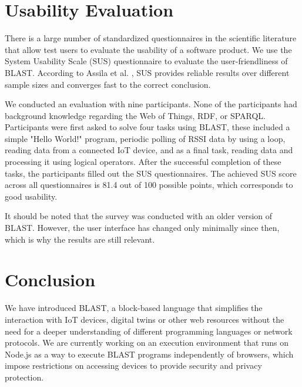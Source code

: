 \documentclass[runningheads]{llncs}
\begin{document}
\section{Usability Evaluation }
There is a large number of standardized questionnaires in the scientific literature that allow test users to evaluate the usability of a software product. We use the System Usability Scale (SUS) questionnaire to evaluate the user-friendliness of BLAST. According to Assila et al. \cite{assila2016standardized}, SUS provides reliable results over different sample sizes and converges fast to the correct conclusion. 

We conducted an evaluation with nine participants. None of the participants had background knowledge regarding the Web of Things, RDF, or SPARQL. Participants were first asked to solve four tasks using BLAST, these included a simple "Hello World!" program, periodic polling of RSSI data by using a loop, reading data from a connected IoT device, and as a final task, reading data and processing it using logical operators. After the successful completion of these tasks, the participants filled out the SUS questionnaires. The achieved SUS score across all questionnaires is 81.4 out of 100 possible points, which corresponds to good usability.

It should be noted that the survey was conducted with an older version of BLAST. However, the user interface has changed only minimally since then, which is why the results are still relevant.

\section{Conclusion}

We have introduced BLAST, a block-based language that simplifies the interaction with IoT devices, digital twins or other web resources without the need for a deeper understanding of different programming languages or network protocols.
We are currently working on an execution environment that runs on Node.js as a way to execute BLAST programs independently of browsers, which impose restrictions on accessing devices to provide security and privacy protection.

%
%
%


%
\end{document}
